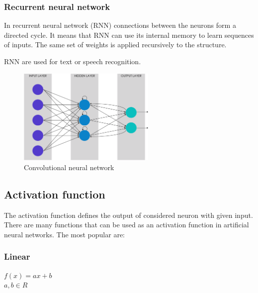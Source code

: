 \subsubsection{Recurrent neural network}
In recurrent neural network (RNN) connections between the neurons form a directed cycle. It means that RNN can use its internal memory to learn  sequences of inputs. The same set of weights is applied recursively to the structure.
\par RNN are used for text or speech recognition.
\begin{figure}[H]
\centering
\includegraphics[width=250px]{pictures/rnn.png}
\caption{Convolutional neural network}
\end{figure}

\subsection{Activation function}
The activation function defines the output of considered neuron with given input. There are many functions that can be used as an activation function in artificial neural networks. The most popular are:
\subsubsection{Linear}
\begin{center}
$ f(x)=ax + b $ \\ $ a,b \in R $ \\~\\
\end{center}

